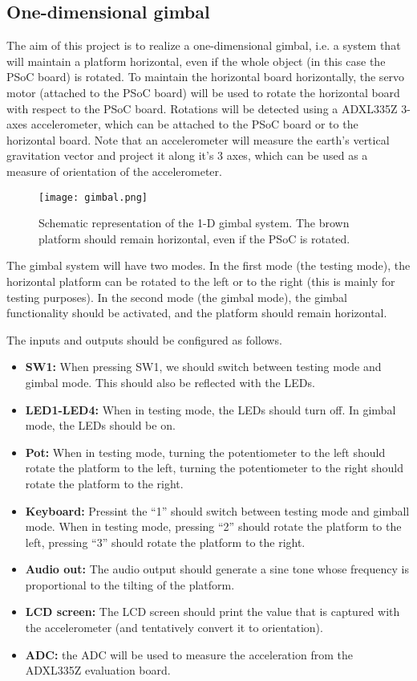 \subsection{One-dimensional gimbal}

The aim of this project is to realize a one-dimensional gimbal, i.e. a system that will maintain a platform horizontal, even if the whole object (in this case the PSoC board) is rotated. To maintain the horizontal board horizontally, the servo motor (attached to the PSoC board) will be used to rotate the horizontal board with respect to the PSoC board. Rotations will be detected using a ADXL335Z 3-axes accelerometer, which can be attached to the PSoC board or to the horizontal board. Note that an accelerometer will measure the earth's vertical gravitation vector and project it along it's 3 axes, which can be used as a measure of orientation of the accelerometer. 
\begin{figure}[h]
	\centering
	\texttt{[image: gimbal.png]}
	\caption{Schematic representation of the 1-D gimbal system. The brown platform should remain horizontal, even if the PSoC is rotated. }
	\label{fig:gimbal}
\end{figure}
The gimbal system will have two modes. In the first mode (the testing mode), the horizontal platform can be rotated to the left or to the right (this is mainly for testing purposes). In the second mode (the gimbal mode), the gimbal functionality should be activated, and the platform should remain horizontal. 

The inputs and outputs should be configured as follows. 
\begin{itemize}
	\item \textbf{SW1: } When pressing SW1, we should switch between testing mode and gimbal mode. This should also be reflected with the LEDs. 
	\item \textbf{LED1-LED4: }When in testing mode, the LEDs should turn off. In gimbal mode, the LEDs should be on. 
	\item \textbf{Pot: }When in testing mode, turning the potentiometer to the left should rotate the platform to the left, turning the potentiometer to the right should rotate the platform to the right. 
	\item \textbf{Keyboard: }Pressint the ``1'' should switch between testing mode and gimball mode. When in testing mode, pressing ``2'' should rotate the platform to the left, pressing ``3'' should rotate the platform to the right. 
	\item \textbf{Audio out: } The audio output should generate a sine tone whose frequency is proportional to the tilting of the platform. 
	\item \textbf{LCD screen: } The LCD screen should print the value that is captured with the accelerometer (and tentatively convert it to orientation). 
	\item \textbf{ADC: } the ADC will be used to measure the acceleration from the ADXL335Z evaluation board. 
\end{itemize}




